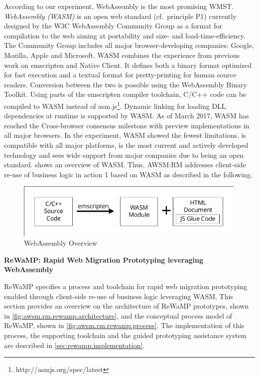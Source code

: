 According to our experiment, WebAssembly is the most promising WMST.
\emph{WebAssembly (WASM)} \autocite{W3C2018WebAssembly} is an open web standard (cf.~principle P1) currently designed by the W3C WebAssembly Community Group as a format for compilation to the web aiming at portability and size- and load-time-efficiency.
The Community Group includes all major browser-developing companies: Google, Mozilla, Apple and Microsoft.
WASM combines the experience from previous work on emscripten and Native Client.
It defines both a binary format optimized for fast execution and a textual format for pretty-printing for human source readers.
Conversion between the two is possible using the WebAssembly Binary Toolkit.
Using parts of the emscripten compiler toolchain, C/C++ code can be compiled to WASM instead of asm.js\footnote{http://asmjs.org/spec/latest}.
Dynamic linking for loading DLL dependencies at runtime is supported by WASM.
As of March 2017, WASM has reached the Cross-browser consensus milestone with preview implementations in all major browsers.
In the experiment, WASM showed the fewest limitations, is compatible with all major platforms, is the most current and actively developed technology and sees wide support from major companies due to being an open standard.
 shows an overview of WASM.
Thus, AWSM:RM addresses client-side re-use of business logic in action 1 based on WASM as described in the following.

\begin{figure}
\hypertarget{fig:awsm.rm.wasm}{%
\centering
\includegraphics[width=0.99\textwidth]{../figures/rewamp/wasm.pdf}
\caption[WebAssembly Overview]{WebAssembly Overview\footnotemark{}}\label{fig:awsm.rm.wasm}
}
\end{figure}

\textbf{ReWaMP: Rapid Web Migration Prototyping leveraging WebAssembly}

ReWaMP \autocite{Heil2018ReWaMP} specifies a process and toolchain for rapid web migration prototyping enabled through client-side re-use of business logic leveraging WASM.
This section provides an overview on the architecture of ReWaMP prototypes, shown in \cref{fig:awsm.rm.rewamp.architecture}, and the conceptual process model of ReWaMP, shown in \cref{fig:awsm.rm.rewamp.process}.
The implementation of this process, the supporting toolchain and the guided prototyping assistance system are described in \cref{sec:rewamp.implementation}.

